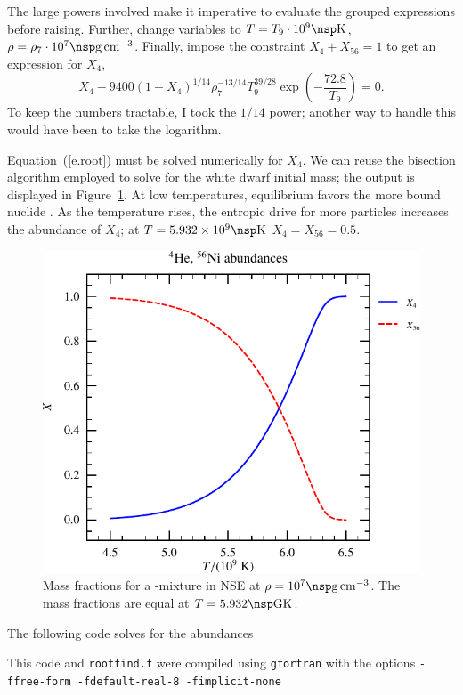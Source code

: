 \documentclass[11pt]{article}
\begin{document}
The large powers involved make it imperative to evaluate the grouped expressions before raising. Further, change variables to $T = T_{9}\cdot 10^{9}\nsp\K$, $\rho = \rho_{7}\cdot 10^{7}\nsp\grampercc$. Finally, impose the constraint $X_{4} + X_{56} = 1$ to get an expression for $X_{4}$,
\begin{equation}\label{e.root}
X_{4} - 9400(1-X_{4})^{1/14}  \rho_{7}^{-13/14} T_{9}^{39/28}\exp\left(-\frac{72.8}{T_{9}}\right) = 0.
\end{equation}
To keep the numbers tractable, I took the $1/14$ power; another way to handle this would have been to take the logarithm.

Equation~(\ref{e.root}) must be solved numerically for $X_{4}$.  We can reuse the bisection algorithm employed to solve for the white dwarf initial mass; the output is displayed in Figure~\ref{f.nse}. At low temperatures, equilibrium favors the more bound nuclide \nickel[56]. As the temperature rises, the entropic drive for more particles increases the abundance of $X_{4}$; at $T = 5.932\ee{9}\nsp\K$ $X_{4}=X_{56}=0.5$.

\begin{figure}[htbp]
\includegraphics[width=5in]{plots_out/mass_fraction}
\caption{Mass fractions for a \helium-\nickel[56] mixture in NSE at $\rho = 10^{7}\nsp\grampercc$.  The mass fractions are equal at $T = 5.932\nsp\Giga\K$.\label{f.nse}}
\end{figure}
\clearpage

The following code solves for the abundances

This code and \verb|rootfind.f| were compiled using \verb|gfortran| with the options
\verb|-ffree-form -fdefault-real-8 -fimplicit-none|
\end{document}
